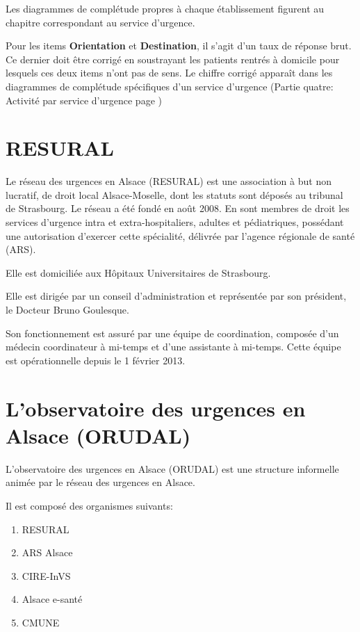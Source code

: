\documentclass[12pt,english,french,twoside]{book}\usepackage[]{graphicx}\usepackage[]{color}
\begin{document}
Les diagrammes de complétude propres à chaque établissement figurent au chapitre correspondant au service d'urgence.

Pour les items \textbf{Orientation} et \textbf{Destination}, il s'agit d'un taux de réponse brut. Ce dernier doit être corrigé en soustrayant les patients rentrés à domicile pour lesquels ces deux items n'ont pas de sens. Le chiffre corrigé apparaît dans les diagrammes de complétude spécifiques d'un service d'urgence (Partie quatre: Activité par service d'urgence page \pageref{partie4})


\newpage
\chapter{RESURAL}


Le réseau des urgences en Alsace (RESURAL) est une association à but non lucratif, de droit local Alsace-Moselle, dont les statuts sont déposés au tribunal de Strasbourg. Le réseau a été fondé en août 2008. En sont membres de droit les services d'urgence intra et extra-hospitaliers, adultes et pédiatriques, possédant une autorisation d'exercer cette spécialité, délivrée par l'agence régionale de santé (ARS). 

Elle est domiciliée aux Hôpitaux Universitaires de Strasbourg.

Elle est dirigée par un conseil d'administration et représentée par son président, le Docteur Bruno Goulesque.

Son fonctionnement est assuré par une équipe de coordination, composée d'un médecin coordinateur à mi-temps et d'une assistante à mi-temps. Cette équipe est opérationnelle depuis le 1\ier{} février 2013.


\newpage
\chapter{L'observatoire des urgences en Alsace (ORUDAL)}


L'observatoire des urgences en Alsace (ORUDAL) est une structure informelle animée par le réseau des urgences en Alsace.

Il est composé des organismes suivants:
\begin{enumerate}
  \item RESURAL 
  \item ARS Alsace
  \item CIRE-InVS
  \item Alsace e-santé
  \item CMUNE
\end{enumerate}
\end{document}
